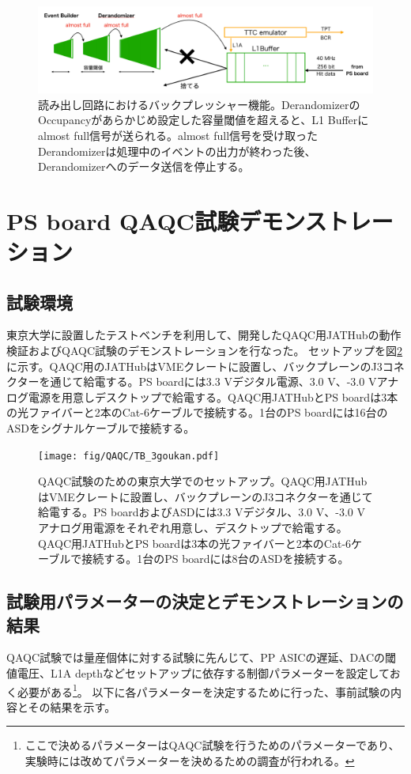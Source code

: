 \begin{figure} 
\centering
\includegraphics[width=16cm]{fig/QAQC/JATHubbackpressure.png}
\caption[リードアウト回路におけるバックプレッシャー機能]{読み出し回路におけるバックプレッシャー機能。DerandomizerのOccupancyがあらかじめ設定した容量閾値を超えると、L1 Bufferにalmost full信号が送られる。almost full信号を受け取ったDerandomizerは処理中のイベントの出力が終わった後、Derandomizerへのデータ送信を停止する。}
\label{JATHubbackpressure}
\end{figure}

\clearpage
\section{PS board QAQC試験デモンストレーション}
\label{sec_PSboardQAQCdemo}

\subsection{試験環境}
\label{subsec_testenv}
東京大学に設置したテストベンチを利用して、開発したQAQC用JATHubの動作検証およびQAQC試験のデモンストレーションを行なった。
セットアップを図\ref{QAQCsetup}に示す。QAQC用のJATHubはVMEクレートに設置し、バックプレーンのJ3コネクターを通じて給電する。PS boardには3.3 Vデジタル電源、3.0 V、-3.0 Vアナログ電源を用意しデスクトップで給電する。QAQC用JATHubとPS boardは3本の光ファイバーと2本のCat-6ケーブルで接続する。1台のPS boardには16台のASDをシグナルケーブルで接続する。

\begin{figure} 
\centering
\texttt{[image: fig/QAQC/TB\_3goukan.pdf]}
\caption[]{QAQC試験のための東京大学でのセットアップ。QAQC用JATHubはVMEクレートに設置し、バックプレーンのJ3コネクターを通じて給電する。PS boardおよびASDには3.3 Vデジタル、3.0 V、-3.0 Vアナログ用電源をそれぞれ用意し、デスクトップで給電する。QAQC用JATHubとPS boardは3本の光ファイバーと2本のCat-6ケーブルで接続する。1台のPS boardには8台のASDを接続する。}
\label{QAQCsetup}
\end{figure}


\subsection{試験用パラメーターの決定とデモンストレーションの結果}
\label{subsec_tb_result}
QAQC試験では量産個体に対する試験に先んじて、PP ASICの遅延、DACの閾値電圧、L1A depthなどセットアップに依存する制御パラメーターを設定しておく必要がある\footnote{ここで決めるパラメーターはQAQC試験を行うためのパラメーターであり、実験時には改めてパラメーターを決めるための調査が行われる。}。
以下に各パラメーターを決定するために行った、事前試験の内容とその結果を示す。

